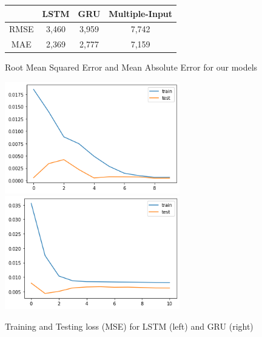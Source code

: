 \documentclass[11pt]{article}
\begin{document}
\begin{figure}[h]
    \centering
    \begin{tabular}{| c  c  c  c|}
        \hline
         & LSTM  & GRU  & Multiple-Input\\ 
         \hline 
         RMSE & 3,460 & 3,959  & 7,742 \\ 
         MAE & 2,369 & 2,777 &  7,159 \\  
         \hline
    \end{tabular}
    \caption{Root Mean Squared Error and Mean Absolute Error for our models}
    \label{results}
\end{figure}

\begin{figure}[h]
    \centering 
    \includegraphics[width=3in]{figs/lstm_loss.png}
    \includegraphics[width=3in]{figs/gru_loss.png}
    \caption{Training and Testing loss (MSE) for LSTM (left) and GRU (right)}
\end{figure}
\end{document}
